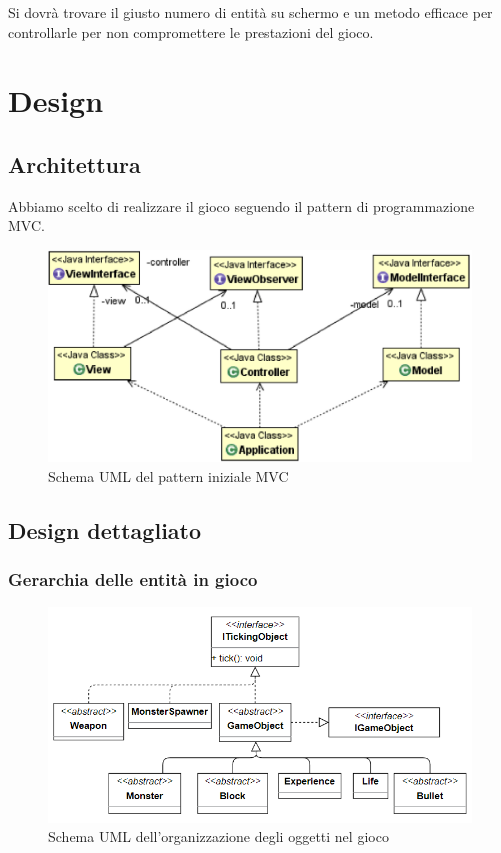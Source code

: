 \documentclass[a4paper,12pt]{report}
\begin{document}
 
Si dovrà trovare il giusto numero di entità su schermo e un metodo efficace per controllarle per non compromettere le prestazioni del gioco.
 


\chapter{Design}
\section{Architettura}

Abbiamo scelto di realizzare il gioco seguendo il pattern di programmazione MVC.

\begin{figure}[H]
	\centering{}
	\includegraphics[scale=0.4]{img/mvc.png}
	\caption{Schema UML del pattern iniziale MVC}
	\label{img:tickingObjectTree}
\end{figure}


\section{Design dettagliato}

\subsection*{Gerarchia delle entità in gioco}

\begin{figure}[H]
	\centering{}
	\includegraphics[width=\textwidth]{img/tickingObjectTree.png}
	\caption{Schema UML dell'organizzazione degli oggetti nel gioco}
	\label{img:tickingObjectTree}
\end{figure}
\end{document}

